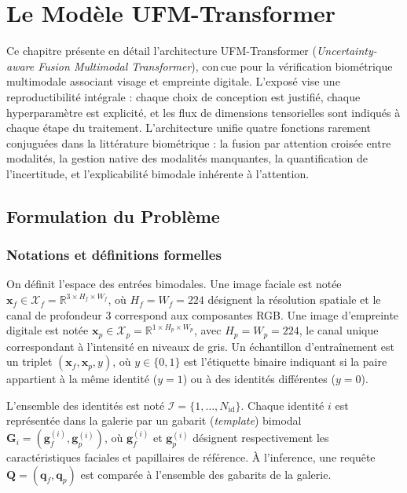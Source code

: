 \documentclass[12pt,a4paper]{report}
\begin{document}
\chapter{Le Mod\`{e}le UFM-Transformer}
\label{chap:modele}

Ce chapitre pr\'{e}sente en d\'{e}tail l'architecture UFM-Transformer (\emph{Uncertainty-aware Fusion Multimodal Transformer}), con\,{c}ue pour la v\'{e}rification biom\'{e}trique multimodale associant visage et empreinte digitale. L'expos\'{e} vise une reproductibilit\'{e} int\'{e}grale : chaque choix de conception est justifi\'{e}, chaque hyperparam\`{e}tre est explicit\'{e}, et les flux de dimensions tensorielles sont indiqu\'{e}s \`{a} chaque \'{e}tape du traitement. L'architecture unifie quatre fonctions rarement conjugu\'{e}es dans la litt\'{e}rature biom\'{e}trique : la fusion par attention crois\'{e}e entre modalit\'{e}s, la gestion native des modalit\'{e}s manquantes, la quantification de l'incertitude, et l'explicabilit\'{e} bimodale inh\'{e}rente \`{a} l'attention.

\section{Formulation du Probl\`{e}me}
\label{sec:formulation}

\subsection{Notations et d\'{e}finitions formelles}

On d\'{e}finit l'espace des entr\'{e}es bimodales. Une image faciale est not\'{e}e $\mathbf{x}_f \in \mathcal{X}_f = \mathbb{R}^{3 \times H_f \times W_f}$, o\`{u} $H_f = W_f = 224$ d\'{e}signent la r\'{e}solution spatiale et le canal de profondeur $3$ correspond aux composantes RGB. Une image d'empreinte digitale est not\'{e}e $\mathbf{x}_p \in \mathcal{X}_p = \mathbb{R}^{1 \times H_p \times W_p}$, avec $H_p = W_p = 224$, le canal unique correspondant \`{a} l'intensit\'{e} en niveaux de gris. Un \'{e}chantillon d'entra\^{i}nement est un triplet $(\mathbf{x}_f, \mathbf{x}_p, y)$, o\`{u} $y \in \{0, 1\}$ est l'\'{e}tiquette binaire indiquant si la paire appartient \`{a} la m\^{e}me identit\'{e} ($y=1$) ou \`{a} des identit\'{e}s diff\'{e}rentes ($y=0$).

L'ensemble des identit\'{e}s est not\'{e} $\mathcal{I} = \{1, \ldots, N_{\text{id}}\}$. Chaque identit\'{e} $i$ est repr\'{e}sent\'{e}e dans la galerie par un gabarit (\emph{template}) bimodal $\mathbf{G}_i = (\mathbf{g}_f^{(i)}, \mathbf{g}_p^{(i)})$, o\`{u} $\mathbf{g}_f^{(i)}$ et $\mathbf{g}_p^{(i)}$ d\'{e}signent respectivement les caract\'{e}ristiques faciales et papillaires de r\'{e}f\'{e}rence. \`{A} l'inference, une requ\^{e}te $\mathbf{Q} = (\mathbf{q}_f, \mathbf{q}_p)$ est compar\'{e}e \`{a} l'ensemble des gabarits de la galerie.
\end{document}

